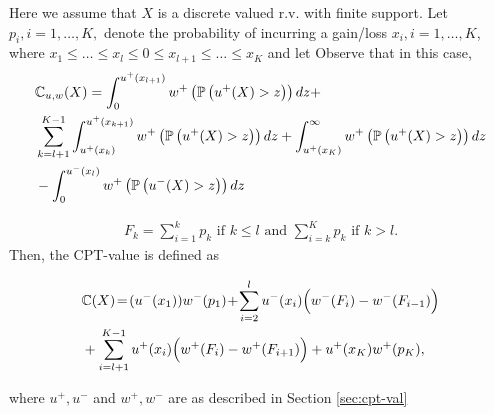 Here we assume that $X$ is a discrete valued r.v. with finite support. 
Let $p_i, i=1,\ldots,K,$ denote the probability of incurring a gain/loss $x_i, i=1,\ldots,K$, where 
$x_1\le \ldots \le x_l \le 0 \le x_{l+1} \le \ldots \le x_K$ and  let
Observe that in this case,
\begin{align}
\label{eq:discrete-integral}
&\mathbb{C}_{u,w}(X)  = \int_0^{u^+(x_{l+1})} w^+\left(\mathbb{P}\left( u^+(X)>z \right)\right) dz + \nonumber \\
&\sum_{k=l+1}^{K-1}\int_{u^+(x_{k})}^{u^+(x_{k+1})} w^+\left(\mathbb{P}\left( u^+(X)>z \right)\right) dz + \int_{u^+(x_{K})}^\infty w^+\left(\mathbb{P}\left( u^+(X)>z \right)\right) dz\\
&-\int_0^{u^-(x_l)} w^+\left(\mathbb{P}\left( u^-(X)>z \right)\right) dz
\end{align}

\begin{align}
\label{eq:Fk}
 F_k = 
   \sum_{i=1}^k p_k  \text{ if   } k \leq l \text{ and }
   \sum_{i=k}^K p_k  \text{ if  }  k > l.
\end{align}
Then, the CPT-value is defined as 
\begin{small}
\begin{align*}
&\mathbb{C}(X) \!=\! (u^-(x_1)) w^-(p_1) 
\!+\!\sum_{i=2}^l u^-(x_i) \Big(w^-(F_i) - w^-(F_{i-1})\Big) \\
& + \sum_{i=l+1}^{K-1} u^+(x_i) \Big(w^+(F_i) - w^+(F_{i+1}) \Big)
 + u^+(x_K) w^+(p_K),
\end{align*} 
\end{small}
where $u^+, u^-$ and $w^+, w^-$ are as described in Section \ref{sec:cpt-val}

